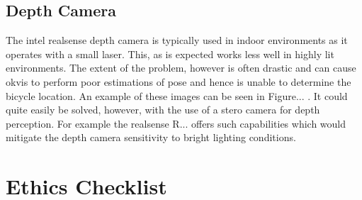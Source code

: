 \documentclass[a4paper,11pt,notitlepage]{article}
\begin{document}
\subsection{Depth Camera}

The intel realsense depth camera is typically used in indoor environments as it operates with a small laser. This, as is expected works less well in highly lit environments. The extent of the problem, however is often drastic and can cause okvis to perform poor estimations of pose and hence is unable to determine the bicycle location. An example of these images can be seen in Figure... . It could quite easily be solved, however, with the use of a stero camera for depth perception. For example the realsense R... offers such capabilities which would mitigate the depth camera sensitivity to bright lighting conditions.




\section{Ethics Checklist}


\end{document}
